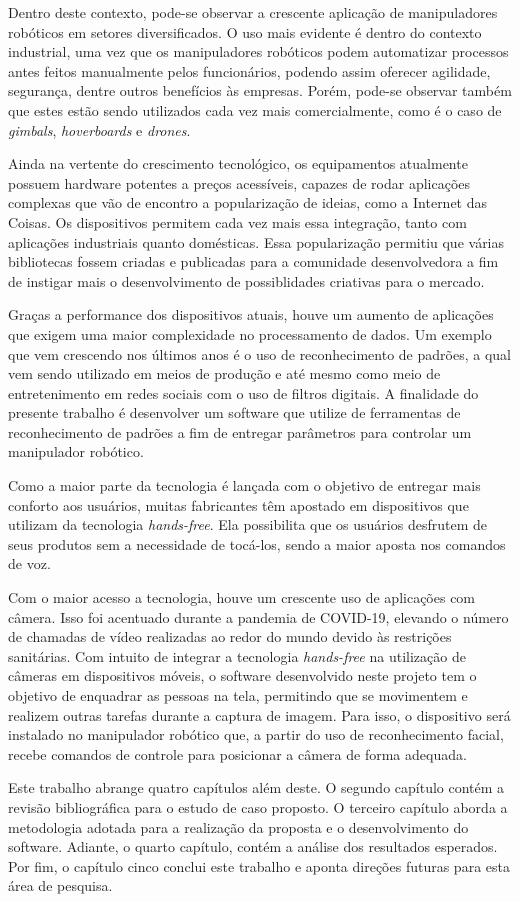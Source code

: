 Dentro deste contexto, pode-se observar a crescente aplicação de manipuladores robóticos em setores diversificados. O uso mais evidente é dentro do contexto industrial, uma vez que os manipuladores robóticos podem automatizar processos antes feitos manualmente pelos funcionários, podendo assim oferecer agilidade, segurança, dentre outros benefícios às empresas. Porém, pode-se observar também que estes estão sendo utilizados cada vez mais comercialmente, como é o caso de \textit{gimbals}, \textit{hoverboards} e \textit{drones}.

Ainda na vertente do crescimento tecnológico, os equipamentos atualmente possuem hardware potentes a preços acessíveis, capazes de rodar aplicações complexas que vão de encontro a popularização de ideias, como a Internet das Coisas. Os dispositivos permitem cada vez mais essa integração, tanto com aplicações industriais quanto domésticas. Essa popularização permitiu que várias bibliotecas fossem criadas e publicadas para a comunidade desenvolvedora a fim de instigar mais o desenvolvimento de possiblidades criativas para o mercado.

Graças a performance dos dispositivos atuais, houve um aumento de aplicações que exigem uma maior complexidade no processamento de dados. Um exemplo que vem crescendo nos últimos anos é o uso de reconhecimento de padrões, a qual vem sendo utilizado em meios de produção e até mesmo como meio de entretenimento em redes sociais com o uso de filtros digitais. A finalidade do presente trabalho é desenvolver um software que utilize de ferramentas de reconhecimento de padrões a fim de entregar parâmetros para controlar um manipulador robótico.

Como a maior parte da tecnologia é lançada com o objetivo de entregar mais conforto aos usuários, muitas fabricantes têm apostado em dispositivos que utilizam da tecnologia \textit{hands-free}. Ela possibilita que os usuários desfrutem de seus produtos sem a necessidade de tocá-los, sendo a maior aposta nos comandos de voz.

Com o maior acesso a tecnologia, houve um crescente uso de aplicações com câmera. Isso foi acentuado durante a pandemia de COVID-19, elevando o número de chamadas de vídeo realizadas ao redor do mundo devido às restrições sanitárias. Com intuito de integrar a tecnologia \textit{hands-free} na utilização de câmeras em dispositivos móveis, o software desenvolvido neste projeto tem o objetivo de enquadrar as pessoas na tela, permitindo que se movimentem e realizem outras tarefas durante a captura de imagem. Para isso, o dispositivo será instalado no manipulador robótico que, a partir do uso de reconhecimento facial, recebe comandos de controle para posicionar a câmera de forma adequada.

Este trabalho abrange quatro capítulos além deste. O segundo capítulo contém a revisão bibliográfica para o estudo de caso proposto. O terceiro capítulo aborda a metodologia adotada para a realização da proposta e o desenvolvimento do software. Adiante, o quarto capítulo, contém a análise dos resultados esperados. Por fim, o capítulo cinco conclui este trabalho e aponta direções futuras para esta área de pesquisa.


